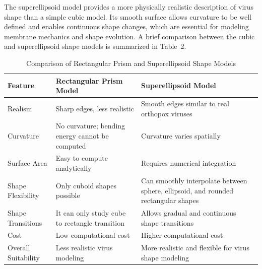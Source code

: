 \documentclass[12pt]{article}
\begin{document}
\begin{flushleft}
The superellipsoid model provides a more physically realistic description of virus shape than a simple cubic model. Its smooth surface allows curvature to be well defined and enables continuous shape changes, which are essential for modeling membrane mechanics and shape evolution. A brief comparison between the cubic and superellipsoid shape models is summarized in Table~2.




\begin{table}[h!]
\centering
\caption{Comparison of Rectangular Prism and Superellipsoid Shape Models}
\label{tab:prism_vs_superellipsoid}
\footnotesize%


\begin{tabular}{
>{\raggedright\arraybackslash}p{3.2cm}
>{\raggedright\arraybackslash}p{5.8cm}
>{\raggedright\arraybackslash}p{5.8cm}
}



\hline
Feature & Rectangular Prism Model & Superellipsoid Model \\
\hline
Realism 
& Sharp edges, less realistic 
& Smooth edges similar to real orthopox viruses \\

Curvature 
& No curvature; bending energy cannot be computed 
& Curvature varies spatially \\

Surface Area 
& Easy to compute analytically 
& Requires numerical integration \\

Shape Flexibility 
& Only cuboid shapes possible 
& Can smoothly interpolate between sphere, ellipsoid, and rounded rectangular shapes \\

Shape Transitions 
& It can only study cube to rectangle transition
& Allows gradual and continuous shape transitions \\

Cost 
& Low computational cost
& Higher  computational cost \\

Overall Suitability 
& Less realistic virus modeling 
& More realistic and flexible for virus shape modeling \\
\hline
\end{tabular}
\end{table}




\vspace{-1em} 

\end{flushleft}
\end{document}
